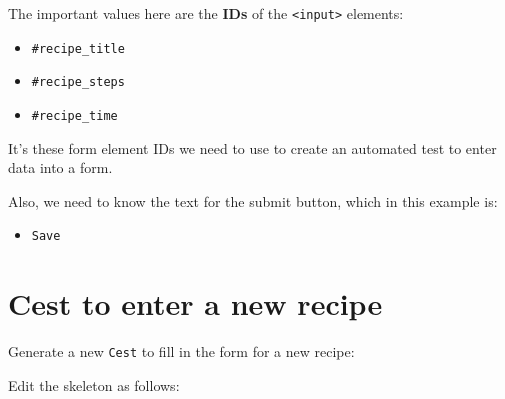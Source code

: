 \documentclass[a4paperpaper,openright]{book}
\newenvironment{Shaded}{}{}
\newcommand{\DecValTok}[1]{\textcolor[rgb]{0.25,0.63,0.44}{#1}}
\newcommand{\ExtensionTok}[1]{#1}
\newcommand{\KeywordTok}[1]{\textcolor[rgb]{0.00,0.44,0.13}{\textbf{#1}}}
\newcommand{\NormalTok}[1]{#1}
\newcommand{\OtherTok}[1]{\textcolor[rgb]{0.00,0.44,0.13}{#1}}
\newcommand{\StringTok}[1]{\textcolor[rgb]{0.25,0.44,0.63}{#1}}
\providecommand{\tightlist}{%
  \setlength{\itemsep}{0pt}\setlength{\parskip}{0pt}}
\begin{document}
The important values here are the \textbf{IDs} of the
\texttt{\textless{}input\textgreater{}} elements:

\begin{itemize}
\tightlist
\item
  \texttt{\#recipe\_title}
\item
  \texttt{\#recipe\_steps}
\item
  \texttt{\#recipe\_time}
\end{itemize}

It's these form element IDs we need to use to create an automated test
to enter data into a form.

Also, we need to know the text for the submit button, which in this
example is:

\begin{itemize}
\tightlist
\item
  \texttt{Save}
\end{itemize}

\hypertarget{cest-to-enter-a-new-recipe}{%
\section{Cest to enter a new recipe}\label{cest-to-enter-a-new-recipe}}

Generate a new \texttt{Cest} to fill in the form for a new recipe:

\begin{Shaded}
\end{Shaded}

Edit the skeleton as follows:

\begin{Shaded}
\end{Shaded}
\end{document}
